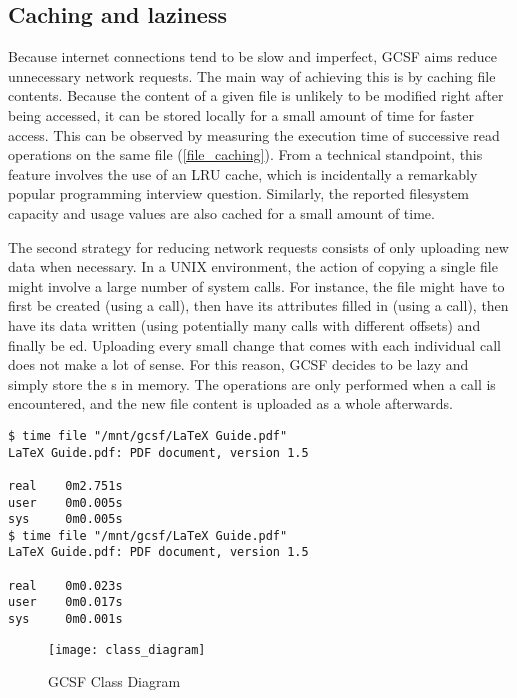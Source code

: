 \subsection{Caching and laziness}

Because internet connections tend to be slow and imperfect, GCSF aims reduce unnecessary network requests. The main way of achieving this is by caching file contents. Because the content of a given file is unlikely to be modified right after being accessed, it can be stored locally for a small amount of time for faster access. This can be observed by measuring the execution time of successive read operations on the same file (\ref{file_caching}). From a technical standpoint, this feature involves the use of an LRU cache, which is incidentally a remarkably popular programming interview question. Similarly, the reported filesystem capacity and usage values are also cached for a small amount of time.

The second strategy for reducing network requests consists of only uploading new data when necessary. In a UNIX environment, the action of copying a single file might involve a large number of system calls. For instance, the file might have to first be created (using a  call), then have its attributes filled in (using a  call), then have its data written (using potentially many  calls with different offsets) and finally be ed. Uploading every small change that comes with each individual  call does not make a lot of sense. For this reason, GCSF decides to be lazy and simply store the s in memory. The operations are only performed when a  call is encountered, and the new file content is uploaded as a whole afterwards.


\begin{lstlisting}[caption=File caching, frame=single, label=file_caching]
$ time file "/mnt/gcsf/LaTeX Guide.pdf"
LaTeX Guide.pdf: PDF document, version 1.5

real    0m2.751s
user    0m0.005s
sys     0m0.005s
$ time file "/mnt/gcsf/LaTeX Guide.pdf"
LaTeX Guide.pdf: PDF document, version 1.5

real    0m0.023s
user    0m0.017s
sys     0m0.001s
\end{lstlisting}


\begin{figure}[bpt]
\caption{GCSF Class Diagram}
\label{fig:gcsf_class_diagram}
\centering
\texttt{[image: class\_diagram]}
\end{figure}
